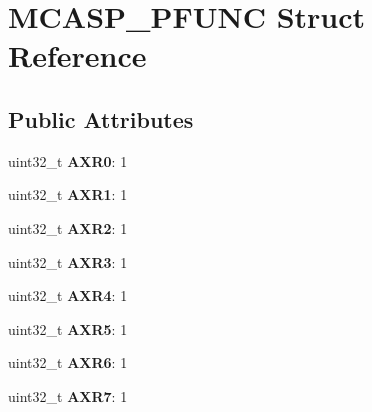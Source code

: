 \hypertarget{structMCASP__PFUNC}{\section{M\-C\-A\-S\-P\-\_\-\-P\-F\-U\-N\-C Struct Reference}
\label{structMCASP__PFUNC}
}
\subsection*{Public Attributes}
\begin{DoxyCompactItemize}
\item 
\hypertarget{structMCASP__PFUNC_a9b05bc35b8b7dee813ef0c629c90f4d9}{uint32\-\_\-t {\bfseries A\-X\-R0}\-: 1}\label{structMCASP__PFUNC_a9b05bc35b8b7dee813ef0c629c90f4d9}

\item 
\hypertarget{structMCASP__PFUNC_a914e1bd8ee8b64704a2e0794048f226a}{uint32\-\_\-t {\bfseries A\-X\-R1}\-: 1}\label{structMCASP__PFUNC_a914e1bd8ee8b64704a2e0794048f226a}

\item 
\hypertarget{structMCASP__PFUNC_adc1c85098dcc19825f4cb433a8aa3be1}{uint32\-\_\-t {\bfseries A\-X\-R2}\-: 1}\label{structMCASP__PFUNC_adc1c85098dcc19825f4cb433a8aa3be1}

\item 
\hypertarget{structMCASP__PFUNC_aa7b8fed19d5c0c5c51db1cd9f14347e2}{uint32\-\_\-t {\bfseries A\-X\-R3}\-: 1}\label{structMCASP__PFUNC_aa7b8fed19d5c0c5c51db1cd9f14347e2}

\item 
\hypertarget{structMCASP__PFUNC_a42e59a8f4eb6ac5ddd8fb03ec32a22e8}{uint32\-\_\-t {\bfseries A\-X\-R4}\-: 1}\label{structMCASP__PFUNC_a42e59a8f4eb6ac5ddd8fb03ec32a22e8}

\item 
\hypertarget{structMCASP__PFUNC_a3dc17221ffd2d30bd8e5ca42daf8d960}{uint32\-\_\-t {\bfseries A\-X\-R5}\-: 1}\label{structMCASP__PFUNC_a3dc17221ffd2d30bd8e5ca42daf8d960}

\item 
\hypertarget{structMCASP__PFUNC_a86be2de7d36323e79957d5c76e6680a2}{uint32\-\_\-t {\bfseries A\-X\-R6}\-: 1}\label{structMCASP__PFUNC_a86be2de7d36323e79957d5c76e6680a2}

\item 
\hypertarget{structMCASP__PFUNC_a13901f26a64af5aaac9f1ca1e4f709a2}{uint32\-\_\-t {\bfseries A\-X\-R7}\-: 1}\label{structMCASP__PFUNC_a13901f26a64af5aaac9f1ca1e4f709a2}


\end{DoxyCompactItemize}
